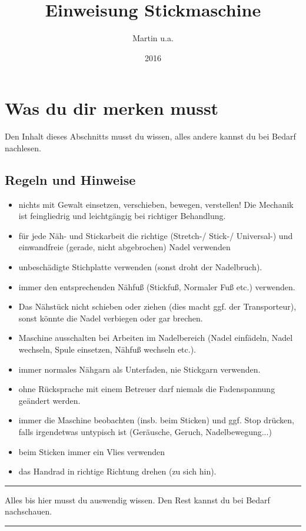 \documentclass{\basedir/fablab-document}
\date{2016}
\author{Martin u.a.}
\title{Einweisung Stickmaschine}
\begin{document}
\maketitle

\section{Was du dir merken musst}
Den Inhalt dieses Abschnitts musst du wissen, alles andere kannst du bei Bedarf nachlesen.
\subsection{Regeln und Hinweise}
\begin{itemize}
 \item nichts mit Gewalt einsetzen, verschieben, bewegen, verstellen! Die Mechanik ist feingliedrig und leichtgängig bei richtiger Behandlung.
 \item für jede Näh- und Stickarbeit die richtige (Stretch-/ Stick-/ Universal-) und einwandfreie (gerade, nicht abgebrochen) Nadel verwenden
 \item unbeschädigte Stichplatte verwenden (sonst droht der Nadelbruch).
 \item immer den entsprechenden Nähfuß (Stickfuß, Normaler Fuß etc.) verwenden.
 \item Das Nähstück nicht schieben oder ziehen (dies macht ggf. der Transporteur), sonst könnte die Nadel verbiegen oder gar brechen.
 \item Maschine ausschalten bei Arbeiten im Nadelbereich (Nadel einfädeln, Nadel wechseln, Spule einsetzen, Nähfuß wechseln etc.).
 \item immer normales Nähgarn als Unterfaden, nie Stickgarn verwenden.
 \item ohne Rücksprache mit einem Betreuer darf niemals die Fadenspannung geändert werden.
 \item immer die Maschine beobachten (insb. beim Sticken) und ggf. Stop drücken, falls irgendetwas untypisch ist (Geräusche, Geruch, Nadelbewegung...)
 \item beim Sticken immer ein Vlies verwenden
 \item das Handrad in richtige Richtung drehen (zu sich hin).
\end{itemize}

\vspace{5em}
\hrule

Alles bis hier musst du auswendig wissen. Den Rest kannst du bei Bedarf nachschauen.
\vspace{0.2em}
\hrule
\vspace{3em}
\end{document}
